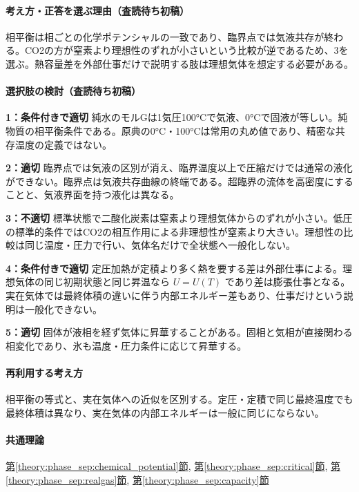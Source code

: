 \paragraph{考え方・正答を選ぶ理由（査読待ち初稿）} 相平衡は相ごとの化学ポテンシャルの一致であり、臨界点では気液共存が終わる。CO2の方が窒素より理想性のずれが小さいという比較が逆であるため、3を選ぶ。熱容量差を外部仕事だけで説明する肢は理想気体を想定する必要がある。

\paragraph{選択肢の検討（査読待ち初稿）}\mbox{}\par

\noindent\textbf{1：条件付きで適切} 純水のモルGは1気圧100°Cで気液、0°Cで固液が等しい。純物質の相平衡条件である。原典の0°C・100°Cは常用の丸め値であり、精密な共存温度の定義ではない。\par

\noindent\textbf{2：適切} 臨界点では気液の区別が消え、臨界温度以上で圧縮だけでは通常の液化ができない。臨界点は気液共存曲線の終端である。超臨界の流体を高密度にすることと、気液界面を持つ液化は異なる。\par

\noindent\textbf{3：不適切} 標準状態で二酸化炭素は窒素より理想気体からのずれが小さい。低圧の標準的条件ではCO2の相互作用による非理想性が窒素より大きい。理想性の比較は同じ温度・圧力で行い、気体名だけで全状態へ一般化しない。\par

\noindent\textbf{4：条件付きで適切} 定圧加熱が定積より多く熱を要する差は外部仕事による。理想気体の同じ初期状態と同じ昇温なら \(U=U(T)\) であり差は膨張仕事となる。実在気体では最終体積の違いに伴う内部エネルギー差もあり、仕事だけという説明は一般化できない。\par

\noindent\textbf{5：適切} 固体が液相を経ず気体に昇華することがある。固相と気相が直接関わる相変化であり、氷も温度・圧力条件に応じて昇華する。\par

\paragraph{再利用する考え方} 相平衡の等式と、実在気体への近似を区別する。定圧・定積で同じ最終温度でも最終体積は異なり、実在気体の内部エネルギーは一般に同じにならない。

\paragraph{共通理論} \hyperref[theory:phase_sep:chemical_potential]{第\ref*{theory:phase_sep:chemical_potential}節}, \hyperref[theory:phase_sep:critical]{第\ref*{theory:phase_sep:critical}節}, \hyperref[theory:phase_sep:realgas]{第\ref*{theory:phase_sep:realgas}節}, \hyperref[theory:phase_sep:capacity]{第\ref*{theory:phase_sep:capacity}節}

